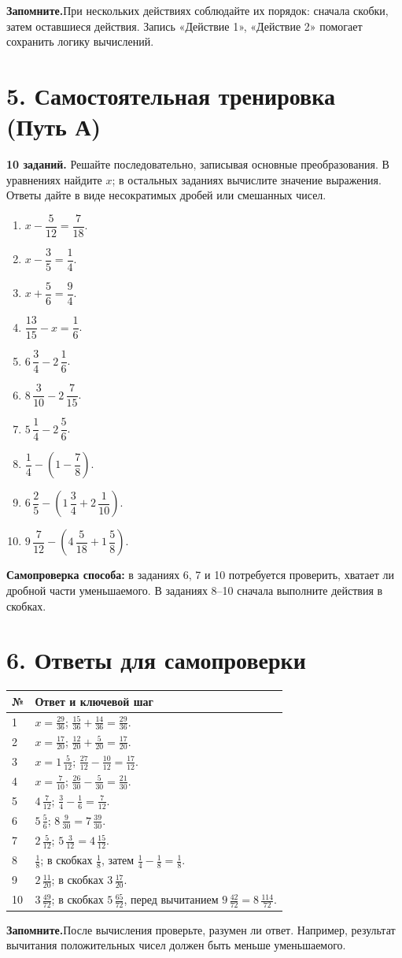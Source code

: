 \documentclass[a4paper,12pt]{article}
\newcommand{\sectionline}[1]{\section*{\color{darkaccent}#1}}
\newcommand{\keyidea}[1]{\par\noindent\textcolor{darkaccent}{\textbf{Запомните.}}\enspace #1\par}
\begin{document}
\keyidea{При нескольких действиях соблюдайте их порядок: сначала скобки, затем оставшиеся действия. Запись «Действие 1», «Действие 2» помогает сохранить логику вычислений.}

\clearpage
\sectionline{5. Самостоятельная тренировка \textnormal{(Путь А)}}
\textbf{10 заданий.} Решайте последовательно, записывая основные преобразования. В уравнениях найдите $x$; в остальных заданиях вычислите значение выражения. Ответы дайте в виде несократимых дробей или смешанных чисел.

\begin{enumerate}[itemsep=1.20em]
\item $x-\dfrac5{12}=\dfrac7{18}$.
\item $x-\dfrac35=\dfrac14$.
\item $x+\dfrac56=\dfrac94$.
\item $\dfrac{13}{15}-x=\dfrac16$.
\item $6\,\dfrac34-2\,\dfrac16$.
\item $8\,\dfrac3{10}-2\,\dfrac7{15}$.
\item $5\,\dfrac14-2\,\dfrac56$.
\item $\dfrac14-\left(1-\dfrac78\right)$.
\item $6\,\dfrac25-\left(1\,\dfrac34+2\,\dfrac1{10}\right)$.
\item $9\,\dfrac7{12}-\left(4\,\dfrac5{18}+1\,\dfrac58\right)$.
\end{enumerate}

\vspace{9mm}
\textbf{Самопроверка способа:} в заданиях 6, 7 и 10 потребуется проверить, хватает ли дробной части уменьшаемого. В заданиях 8--10 сначала выполните действия в скобках.

\clearpage
\sectionline{6. Ответы для самопроверки}
\renewcommand{\arraystretch}{1.38}
\begin{tabularx}{\linewidth}{@{}p{12mm}X@{}}
\toprule
\textbf{№}&\textbf{Ответ и ключевой шаг}\\
\midrule
1&$x=\frac{29}{36}$; $\frac{15}{36}+\frac{14}{36}=\frac{29}{36}$.\\
2&$x=\frac{17}{20}$; $\frac{12}{20}+\frac5{20}=\frac{17}{20}$.\\
3&$x=1\,\frac5{12}$; $\frac{27}{12}-\frac{10}{12}=\frac{17}{12}$.\\
4&$x=\frac7{10}$; $\frac{26}{30}-\frac5{30}=\frac{21}{30}$.\\
5&$4\,\frac7{12}$; $\frac34-\frac16=\frac7{12}$.\\
6&$5\,\frac56$; $8\,\frac9{30}=7\,\frac{39}{30}$.\\
7&$2\,\frac5{12}$; $5\,\frac3{12}=4\,\frac{15}{12}$.\\
8&$\frac18$; в скобках $\frac18$, затем $\frac14-\frac18=\frac18$.\\
9&$2\,\frac{11}{20}$; в скобках $3\,\frac{17}{20}$.\\
10&$3\,\frac{49}{72}$; в скобках $5\,\frac{65}{72}$, перед вычитанием $9\,\frac{42}{72}=8\,\frac{114}{72}$.\\
\bottomrule
\end{tabularx}

\vspace{8mm}
\keyidea{После вычисления проверьте, разумен ли ответ. Например, результат вычитания положительных чисел должен быть меньше уменьшаемого.}
\end{document}
